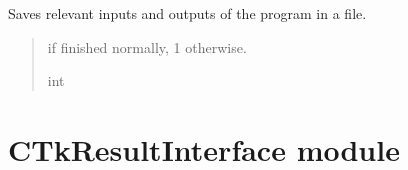 \documentclass[letterpaper,10pt,english]{sphinxmanual}
\begin{document}
\begin{fulllineitems}
\begin{fulllineitems}
\begin{quote}
\begin{description}
\end{description}\end{quote}

\end{fulllineitems}


\begin{fulllineitems}
\label{\detokenize{CTkInterface:src.CTkInterface.MainApp.save_results}}
\pysigstartsignatures
{}
\pysigstopsignatures
\sphinxAtStartPar
Saves relevant inputs and outputs of the program in a file.
\begin{quote}\begin{description}
 if  finished normally, 1 otherwise.

\sphinxAtStartPar
int

\end{description}\end{quote}

\end{fulllineitems}


\end{fulllineitems}


\sphinxstepscope


\chapter{CTkResultInterface module}
\label{\detokenize{CTkResultInterface:module-src.CTkResultInterface}}\label{\detokenize{CTkResultInterface:ctkresultinterface-module}}\label{\detokenize{CTkResultInterface::doc}}
\end{document}
